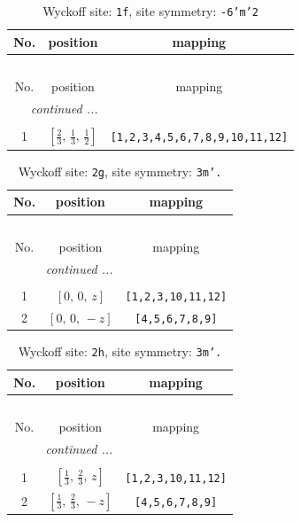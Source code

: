 \documentclass[fleqn,8pt]{jsarticle}
\begin{document}
\renewcommand{\arraystretch}{1.2}
\begin{longtable}{ccc}
\caption{Wyckoff site: {\tt 1f}, site symmetry: {\tt -6'm'2}}
 \\
 \hline \hline
No. & position & mapping \\ \hline \endfirsthead

\multicolumn{2}{l}{\tablename\ \thetable{}} \\
 \hline \hline
No. & position & mapping \\ \hline \endhead

 \hline \hline
\multicolumn{2}{r}{\footnotesize\it continued ...} \\ \endfoot

 \hline \hline
\multicolumn{2}{r}{} \\ \endlastfoot

1 & $\left[ \frac{2}{3},\, \frac{1}{3},\, \frac{1}{2} \right]$ & {\tt [1,2,3,4,5,6,7,8,9,10,11,12]} \\
\end{longtable}
\renewcommand{\arraystretch}{1.2}
\begin{longtable}{ccc}
\caption{Wyckoff site: {\tt 2g}, site symmetry: {\tt 3m'.}}
 \\
 \hline \hline
No. & position & mapping \\ \hline \endfirsthead

\multicolumn{2}{l}{\tablename\ \thetable{}} \\
 \hline \hline
No. & position & mapping \\ \hline \endhead

 \hline \hline
\multicolumn{2}{r}{\footnotesize\it continued ...} \\ \endfoot

 \hline \hline
\multicolumn{2}{r}{} \\ \endlastfoot

1 & $\left[ 0,\, 0,\, z \right]$ & {\tt [1,2,3,10,11,12]} \\ \hline
2 & $\left[ 0,\, 0,\, - z \right]$ & {\tt [4,5,6,7,8,9]} \\
\end{longtable}
\renewcommand{\arraystretch}{1.2}
\begin{longtable}{ccc}
\caption{Wyckoff site: {\tt 2h}, site symmetry: {\tt 3m'.}}
 \\
 \hline \hline
No. & position & mapping \\ \hline \endfirsthead

\multicolumn{2}{l}{\tablename\ \thetable{}} \\
 \hline \hline
No. & position & mapping \\ \hline \endhead

 \hline \hline
\multicolumn{2}{r}{\footnotesize\it continued ...} \\ \endfoot

 \hline \hline
\multicolumn{2}{r}{} \\ \endlastfoot

1 & $\left[ \frac{1}{3},\, \frac{2}{3},\, z \right]$ & {\tt [1,2,3,10,11,12]} \\ \hline
2 & $\left[ \frac{1}{3},\, \frac{2}{3},\, - z \right]$ & {\tt [4,5,6,7,8,9]} \\
\end{longtable}
\end{document}
